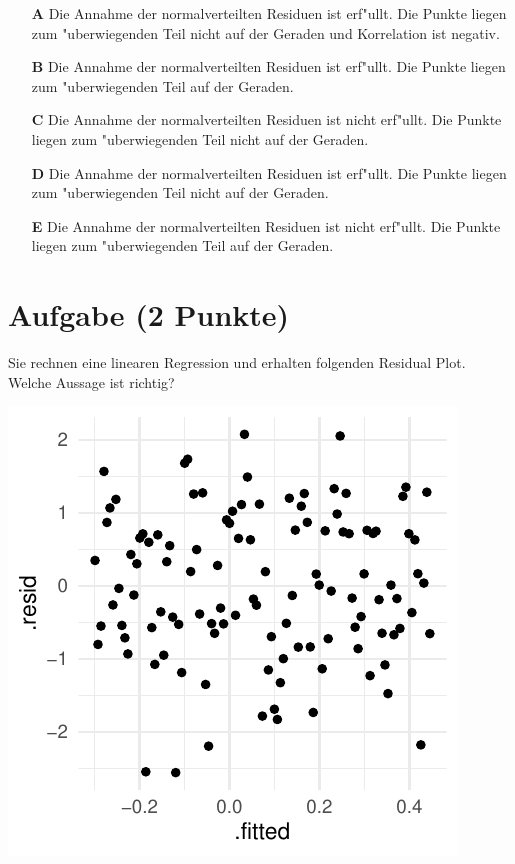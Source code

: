 \documentclass[a4paper, 9pt]{scrartcl}\usepackage[]{graphicx}\usepackage[]{xcolor}
\makeatletter
\def\maxwidth{ %
  \ifdim\Gin@nat@width>\linewidth
    \linewidth
  \else
    \Gin@nat@width
  \fi
}
\makeatother
\begin{document}
\begin{enumerate}
\item [\textbf{A} \msquare] Die Annahme der normalverteilten Residuen ist erf{"u}llt. Die Punkte liegen zum {"u}berwiegenden Teil nicht auf der Geraden und Korrelation ist negativ.
\item [\textbf{B} \msquare] Die Annahme der normalverteilten Residuen ist erf{"u}llt. Die Punkte liegen zum {"u}berwiegenden Teil auf der Geraden.
\item [\textbf{C} \msquare] Die Annahme der normalverteilten Residuen ist nicht erf{"u}llt. Die Punkte liegen zum {"u}berwiegenden Teil nicht auf der Geraden.
\item [\textbf{D} \msquare] Die Annahme der normalverteilten Residuen ist erf{"u}llt. Die Punkte liegen zum {"u}berwiegenden Teil nicht auf der Geraden.
\item [\textbf{E} \msquare] Die Annahme der normalverteilten Residuen ist nicht erf{"u}llt. Die Punkte liegen zum {"u}berwiegenden Teil auf der Geraden.
\end{enumerate}

\section{Aufgabe \hfill (2 Punkte)}

Sie rechnen eine linearen Regression und erhalten folgenden Residual
Plot. Welche Aussage ist richtig?




{\centering \includegraphics[width=\maxwidth]{img/mc-regression-06-a-1} 

}
\end{document}
